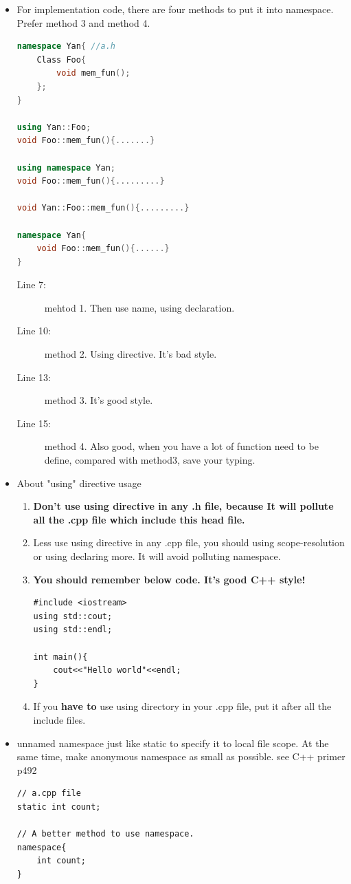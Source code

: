 \documentclass[a4paper,11pt,twoside]{book}
\begin{document}
\begin{itemize}
	\item For implementation code, there are four methods to put it into namespace. Prefer method 3 and method 4.
	
\begin{lstlisting}[frame=single, language=c++]
namespace Yan{ //a.h
	Class Foo{
		void mem_fun();
	};
}
	
using Yan::Foo;
void Foo::mem_fun(){.......}
	
using namespace Yan;
void Foo::mem_fun(){.........}
	
void Yan::Foo::mem_fun(){.........}

namespace Yan{ 
	void Foo::mem_fun(){......}
}
\end{lstlisting}
\begin{description}
	\item[Line 7:]mehtod 1. Then use name, using declaration.
	\item[Line 10:]method 2. Using directive. It's bad style.
	\item[Line 13:]method 3. It's good style.
	\item[Line 15:]method 4. Also good, when you have a lot of function need to be define, compared with method3, save your typing.
\end{description}
	
	\item About "using" directive usage
	\begin{enumerate}
		\item  \textbf{Don't use using directive in any .h file,  because It will pollute all the .cpp file which include this head file.}
		
		\item  Less use using directive in any .cpp file, you should using scope-resolution or using declaring more. It will avoid polluting namespace.
		
\item \textbf{You should remember below code. It's good C++ style!} 
\begin{lstlisting}[numbers=none]
#include <iostream>
using std::cout;
using std::endl;

int main(){
	cout<<"Hello world"<<endl;
}
\end{lstlisting}
		
		\item If you \textbf{have to} use using directory in your .cpp file, put it after all the include files.
	\end{enumerate}
	
	\item unnamed namespace just like static to specify it to local file scope. At the same time, make anonymous namespace as small as possible.  see C++ primer p492
	
\begin{lstlisting}[numbers=none]
// a.cpp file
static int count;
	
// A better method to use namespace.
namespace{
	int count;
}
\end{lstlisting}
	
\end{itemize}
\end{document}
